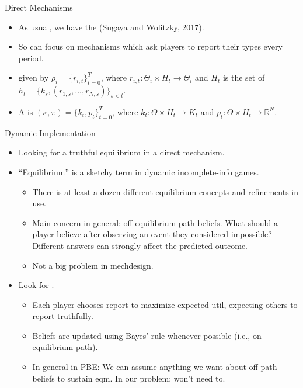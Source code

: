 \documentclass[english,10pt
,aspectratio=169
]{beamer}
\begin{document}
\begin{frame}{Direct Mechanisms}
\begin{itemize}
	\item As usual, we have the  (Sugaya and Wolitzky, 2017).
	\item So can focus on mechanisms which ask players to report their types every period.
	\item {} given by $\rho_i = \{r_{i,t}\}_{t=0}^T$, where $r_{i,t}: \Theta_i \times H_t \to \Theta_i$ and $H_t$ is the set of  $h_t = \{k_s,(r_{1,s},...,r_{N,s})\}_{s < t}$.
	\item A  is $(\kappa,\pi) = \{k_t,p_t\}_{t=0}^T$, where $k_t: \Theta \times H_t \to K_t$ and $p_t: \Theta \times H_t \to \mathbb{R}^N$.
\end{itemize}
\end{frame}


\begin{frame}{Dynamic Implementation}
\begin{itemize}
	\item Looking for a truthful equilibrium in a direct mechanism.
	\item ``Equilibrium'' is a sketchy term in dynamic incomplete-info games.
	\begin{itemize}
		\item There is at least a dozen different equilibrium concepts and refinements in use.
		\item Main concern in general: off-equilibrium-path beliefs. What should a player believe after observing an event they considered impossible? Different answers can strongly affect the predicted outcome.
		\item Not a big problem in mechdesign.
	\end{itemize}
	\item Look for .
	\begin{itemize}
		\item Each player chooses report to maximize expected util, expecting others to report truthfully.
		\item Beliefs are updated using Bayes' rule whenever possible (i.e., on equilibrium path).
		\item In general in PBE: We can assume anything we want about off-path beliefs to sustain eqm. In our problem: won't need to.
	\end{itemize}
\end{itemize}
\end{frame}
\end{document}
